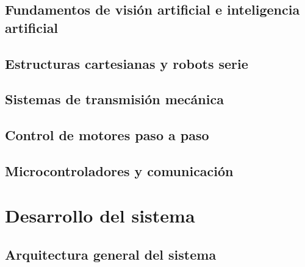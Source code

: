 \documentclass[a4paper,12pt]{report}
\begin{document}
\section{Fundamentos de visión artificial e inteligencia artificial}






\section{Estructuras cartesianas y robots serie}


\section{Sistemas de transmisión mecánica}


\section{Control de motores paso a paso}

%
%
\section{Microcontroladores y comunicación}

\chapter{Desarrollo del sistema}

\section{Arquitectura general del sistema}




\end{document}
